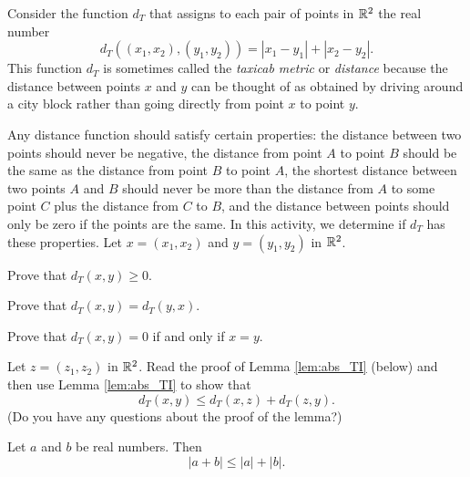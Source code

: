  
\begin{pa} Consider the function $d_T$ that assigns to each pair of points in $\mathbb{R}^2$ the real number 
\[d_T((x_1,x_2),(y_1,y_2)) = | x_1-y_1 | + | x_2-y_2 |.\] 
This function $d_T$ is sometimes called the \emph{taxicab metric} or \emph{distance} because the distance between points $x$ and $y$ can be thought of as obtained by driving around a city block rather than going directly from point $x$ to point $y$. 

Any distance function should satisfy certain properties: the distance between two points should never be negative, the distance from point $A$ to point $B$ should be the same as the distance from point $B$ to point $A$, the shortest distance between two points $A$ and $B$ should never be more than the distance from $A$ to some point $C$ plus the distance from $C$ to $B$, and the distance between points should only be zero if the points are the same. In this activity, we determine if $d_T$ has these properties. Let $x=(x_1,x_2)$ and $y=(y_1,y_2)$ in $\mathbb{R}^2$. 

\be
\item Prove that $d_T(x,y) \geq 0$. 

\item Prove that $d_T(x,y) = d_T(y,x)$. 

\item  Prove that $d_T(x,y) = 0$ if and only if $x = y$. 

\item Let $z = (z_1,z_2)$ in $\mathbb{R}^2$. Read the proof of Lemma \ref{lem:abs_TI} (below) and then use Lemma \ref{lem:abs_TI} to show that 
\[d_T(x,y) \leq d_T(x,z) + d_T(z,y).\]	
(Do you have any questions about the proof of the lemma?)

\begin{lemma} \label{lem:abs_TI} Let $a$ and $b$ be real numbers. Then
\[| a+b | \leq | a | + | b |.\]
\end{lemma}


\end{pa}
